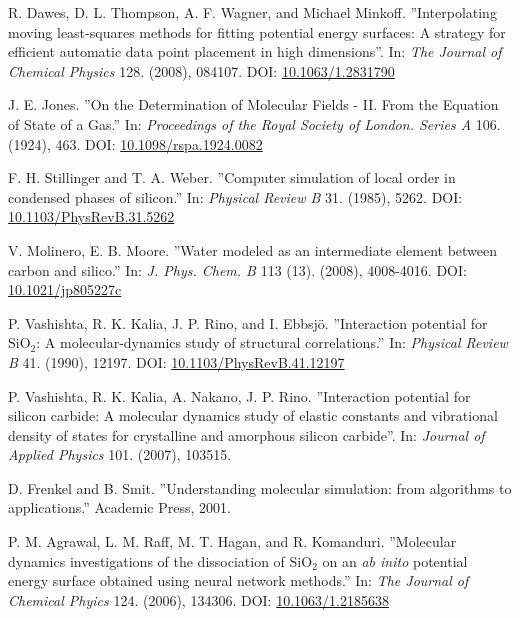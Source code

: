 \documentclass[twoside,english]{uiofysmaster}
\begin{document}
\begin{thebibliography}{56}
 R. Dawes, D. L. Thompson, A. F. Wagner, and Michael Minkoff. 
 ''Interpolating moving least-squares methods for fitting potential energy surfaces:
 A strategy for efficient automatic data point placement in high dimensions''. 
 In: \textit{The Journal of Chemical Physics} 128. (2008), 084107.
 DOI: \href{http://dx.doi.org/10.1063/1.2831790}{10.1063/1.2831790}
 
 J. E. Jones. 
 ''On the Determination of Molecular Fields - II. From the Equation of State of a Gas.''
 In: \textit{Proceedings of the Royal Society of London. Series A} 106. (1924), 463. 
 DOI: \href{http://dx.doi.org/10.1098/rspa.1924.0082}{10.1098/rspa.1924.0082}
 
 F. H. Stillinger and T. A. Weber. 
 ''Computer simulation of local order in condensed phases of silicon.'' 
 In: \textit{Physical Review B} 31. (1985), 5262. 
 DOI: \href{http://dx.doi.org/0.1103/PhysRevB.31.5262}{10.1103/PhysRevB.31.5262}
 
 V. Molinero, E. B. Moore. 
 ''Water modeled as an intermediate element between carbon and silico.'' 
 In: \textit{J. Phys. Chem. B} 113 (13). (2008), 4008-4016. 
 DOI: \href{http://dx.doi.org/10.1021/jp805227c}{10.1021/jp805227c}
 
 P. Vashishta, R. K. Kalia, J. P. Rino, and I. Ebbsj\"{o}.
 ''Interaction potential for $\mathrm{SiO}_2$: A molecular-dynamics study of structural correlations.''
 In: \textit{Physical Review B} 41. (1990), 12197. 
 DOI: \href{http://dx.doi.org/10.1103/PhysRevB.41.12197}{10.1103/PhysRevB.41.12197}
 
 P. Vashishta, R. K. Kalia, A. Nakano, J. P. Rino. 
 ''Interaction potential for silicon carbide: A molecular dynamics study of elastic constants
 and vibrational density of states for crystalline and amorphous silicon carbide''. 
 In: \textit{Journal of Applied Physics} 101. (2007), 103515. 
 
 D. Frenkel and B. Smit. 
 ''Understanding molecular simulation: from algorithms to applications.''
 Academic Press, 2001.

 P. M. Agrawal, L. M. Raff, M. T. Hagan, and R. Komanduri. 
 ''Molecular dynamics investigations of the dissociation of $\mathrm{SiO}_2$ on an \textit{ab inito}
 potential energy surface obtained using neural network methods.'' 
 In: \textit{The Journal of Chemical Phyics} 124. (2006), 134306. 
 DOI: \href{http://dx.doi.org/10.1063/1.2185638}{10.1063/1.2185638}
 

\end{thebibliography}
\end{document}
